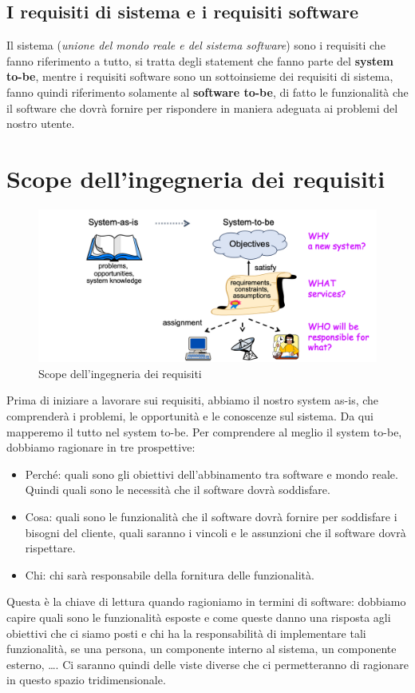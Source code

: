 \subsection{I requisiti di sistema e i requisiti software}
Il sistema (\textit{unione del mondo reale e del sistema software}) sono 
i requisiti che fanno riferimento a tutto, si tratta degli statement che 
fanno parte del \textbf{system to-be}, mentre i requisiti software
sono un sottoinsieme dei requisiti di sistema, fanno quindi riferimento
solamente al \textbf{software to-be}, di fatto le funzionalità che il software 
che dovrà fornire per rispondere in maniera adeguata ai 
problemi del nostro utente.

\section{Scope dell'ingegneria dei requisiti}
\begin{figure}[H]
    \centering
    \includegraphics[scale=0.3]{img/scope.png}
    \caption{Scope dell'ingegneria dei requisiti}
    \label{fig:scope}
\end{figure}
Prima di iniziare a lavorare sui requisiti, abbiamo il nostro 
system as-is, che comprenderà i problemi, le opportunità e le 
conoscenze sul sistema. Da qui mapperemo il tutto nel 
system to-be. Per comprendere al meglio il system to-be,
dobbiamo ragionare in tre prospettive:
\begin{itemize}
    \item Perché: quali sono gli obiettivi dell'abbinamento 
    tra software e mondo reale. Quindi quali sono le necessità 
    che il software dovrà soddisfare.
    \item Cosa: quali sono le funzionalità che il software dovrà
    fornire per soddisfare i bisogni del cliente, quali saranno i 
    vincoli e le assunzioni che il software dovrà rispettare.
    \item Chi: chi sarà responsabile della fornitura 
    delle funzionalità.
\end{itemize}
Questa è la chiave di lettura quando ragioniamo in termini 
di software: dobbiamo capire quali sono le funzionalità esposte e come 
queste danno una risposta agli obiettivi che ci siamo posti e 
chi ha la responsabilità di implementare tali funzionalità, se una persona,
un componente interno al sistema, un componente esterno, \dots.
Ci saranno quindi delle viste diverse che ci permetteranno di ragionare 
in questo spazio tridimensionale.
